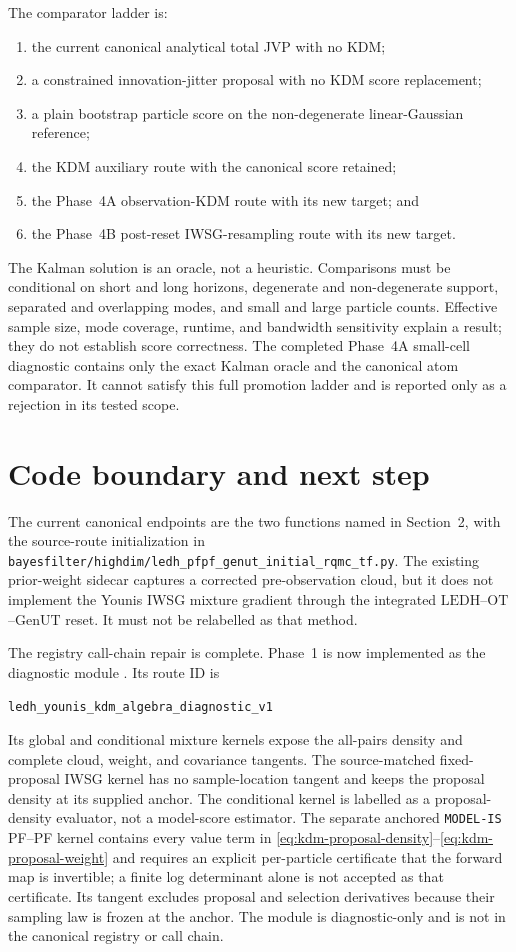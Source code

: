 \documentclass[11pt]{article}
\newcommand{\LEDH}{\ensuremath{\mathrm{LEDH}}}
\newcommand{\GenUT}{\ensuremath{\mathrm{GenUT}}}
\newcommand{\OT}{\ensuremath{\mathrm{OT}}}
\begin{document}
The comparator ladder is:
\begin{enumerate}[leftmargin=2em]
  \item the current canonical analytical total JVP with no KDM;
  \item a constrained innovation-jitter proposal with no KDM score
        replacement;
  \item a plain bootstrap particle score on the non-degenerate
        linear-Gaussian reference;
  \item the KDM auxiliary route with the canonical score retained;
  \item the Phase~4A observation-KDM route with its new target; and
  \item the Phase~4B post-reset IWSG-resampling route with its new target.
\end{enumerate}
The Kalman solution is an oracle, not a heuristic.  Comparisons must be
conditional on short and long horizons, degenerate and non-degenerate
support, separated and overlapping modes, and small and large particle
counts.  Effective sample size, mode coverage, runtime, and bandwidth
sensitivity explain a result; they do not establish score correctness.
The completed Phase~4A small-cell diagnostic contains only the exact Kalman
oracle and the canonical atom comparator.  It cannot satisfy this full
promotion ladder and is reported only as a rejection in its tested scope.

\section{Code boundary and next step}

The current canonical endpoints are the two functions named in
Section~2, with the source-route initialization in
\texttt{bayesfilter/highdim/ledh\_pfpf\_genut\_initial\_rqmc\_tf.py}.  The
existing prior-weight sidecar captures a corrected pre-observation cloud, but
it does not implement the Younis IWSG mixture gradient through the integrated
\LEDH{}--\OT{}--\GenUT{} reset.  It must not be relabelled as that method.

The registry call-chain repair is complete.  Phase~1 is now implemented as the
diagnostic module
.  Its route ID is
\begin{center}
\texttt{ledh\_younis\_kdm\_algebra\_}\texttt{diagnostic\_v1}
\end{center}
Its global and
conditional mixture kernels expose the all-pairs density and complete cloud,
weight, and covariance tangents.  The source-matched fixed-proposal IWSG
kernel has no sample-location tangent and keeps the proposal density at its
supplied anchor.  The conditional kernel is labelled as a proposal-density
evaluator, not a model-score estimator.  The separate anchored
\texttt{MODEL-IS} PF--PF kernel contains every value term in
\eqref{eq:kdm-proposal-density}--\eqref{eq:kdm-proposal-weight} and requires
an explicit per-particle certificate that the forward map is invertible; a
finite log determinant alone is not accepted as that certificate.  Its
tangent excludes proposal and selection derivatives because their sampling
law is frozen at the anchor.  The module is diagnostic-only and is not in the
canonical registry or call chain.
\end{document}

